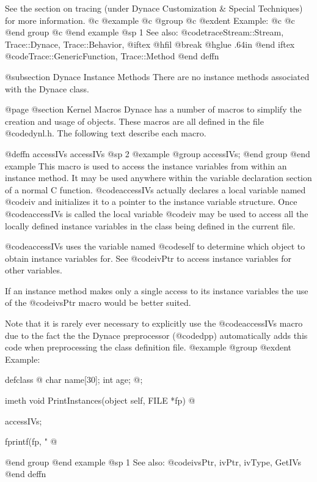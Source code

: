 See the section on tracing (under Dynace Customization & Special Techniques)
for more information.
@c @example
@c @group
@c @exdent Example:
@c 
@c @end group
@c @end example
@sp 1
See also:  @code{traceStream::Stream, Trace::Dynace, Trace::Behavior,}
@iftex
@hfil @break @hglue .64in 
@end iftex
@code{Trace::GenericFunction, Trace::Method}
@end deffn








@subsection Dynace Instance Methods
There are no instance methods associated with the Dynace class.





@page
@section Kernel Macros
Dynace has a number of macros to simplify the creation and usage of objects.
These macros are all defined in the file @code{dynl.h}.  The following
text describe each macro.











@deffn {accessIVs} accessIVs
@sp 2
@example
@group
accessIVs;
@end group
@end example
This macro is used to access the instance variables from within an
instance method.  It may be used anywhere within the variable
declaration section of a normal C function.  @code{accessIVs} actually
declares a local variable named @code{iv} and initializes it to a
pointer to the instance variable structure.  Once @code{accessIVs} is
called the local variable @code{iv} may be used to access all the
locally defined instance variables in the class being defined in the
current file.

@code{accessIVs} uses the variable named @code{self} to determine which
object to obtain instance variables for.  See @code{ivPtr} to access
instance variables for other variables.

If an instance method makes only a single access to its instance variables
the use of the @code{ivsPtr} macro would be better suited.

Note that it is rarely ever necessary to explicitly use the
@code{accessIVs} macro due to the fact the the Dynace preprocessor
(@code{dpp}) automatically adds this code when preprocessing the class
definition file.
@example
@group
@exdent Example:

defclass  @{
      char    name[30];
      int     age;
@};

imeth void    PrintInstances(object self, FILE *fp)
@{
      accessIVs;

      fprintf(fp, "%
@}
@end group
@end example
@sp 1
See also:  @code{ivsPtr, ivPtr, ivType, GetIVs}
@end deffn














